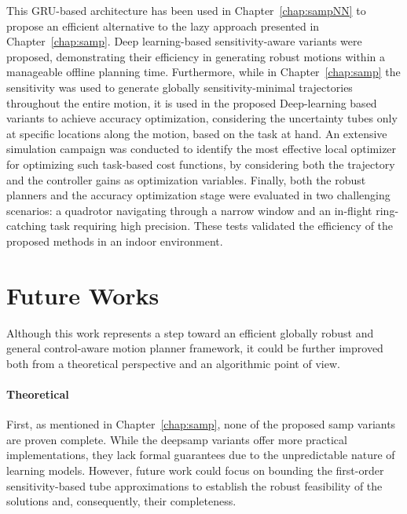 This GRU-based architecture has been used in Chapter~\ref{chap:sampNN} to propose an efficient alternative to the lazy approach presented in Chapter~\ref{chap:samp}.
Deep learning-based sensitivity-aware variants were proposed, demonstrating their efficiency in generating robust motions within a manageable offline planning time.
Furthermore, while in Chapter~\ref{chap:samp} the sensitivity was used to generate globally sensitivity-minimal trajectories throughout the entire motion, it is used in the proposed Deep-learning based variants to achieve accuracy optimization, considering the uncertainty tubes only at specific locations along the motion, based on the task at hand.
An extensive simulation campaign was conducted to identify the most effective local optimizer for optimizing such task-based cost functions, by considering both the trajectory and the controller gains as optimization variables.
Finally, both the robust planners and the accuracy optimization stage were evaluated in two challenging scenarios: a quadrotor navigating through a narrow window and an in-flight ring-catching task requiring high precision. 
These tests validated the efficiency of the proposed methods in an indoor environment.

\section{Future Works}

Although this work represents a step toward an efficient globally robust and general control-aware motion planner framework, it could be further improved both from a theoretical perspective and an algorithmic point of view.

\paragraph{Theoretical}

First, as mentioned in Chapter~\ref{chap:samp}, none of the proposed \gls{samp} variants are proven complete.
While the \gls{deepsamp} variants offer more practical implementations, they lack formal guarantees due to the unpredictable nature of learning models.
However, future work could focus on bounding the first-order sensitivity-based tube approximations to establish the robust feasibility of the  solutions and, consequently, their completeness.

